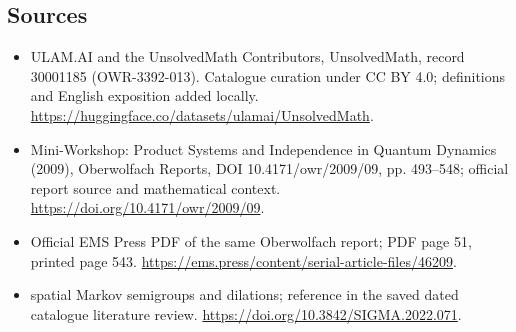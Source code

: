 \documentclass[11pt]{article}
\begin{document}
\subsection{Sources}
\begin{itemize}
\item[\hypertarget{source:30001185:1}{S1}] ULAM.AI and the UnsolvedMath Contributors, UnsolvedMath, record 30001185 (OWR-3392-013). Catalogue curation under CC BY 4.0; definitions and English exposition added locally.
\url{https://huggingface.co/datasets/ulamai/UnsolvedMath}.
\item[\hypertarget{source:30001185:2}{S2}] Mini-Workshop: Product Systems and Independence in Quantum Dynamics (2009), Oberwolfach Reports, DOI 10.4171/owr/2009/09, pp. 493--548; official report source and mathematical context.
\url{https://doi.org/10.4171/owr/2009/09}.
\item[\hypertarget{source:30001185:3}{S3}] Official EMS Press PDF of the same Oberwolfach report; PDF page 51, printed page 543.
\url{https://ems.press/content/serial-article-files/46209}.
\item[\hypertarget{source:30001185:4}{S4}] spatial Markov semigroups and dilations; reference in the saved dated catalogue literature review.
\url{https://doi.org/10.3842/SIGMA.2022.071}.
\end{itemize}
\label{end:30001185}
\end{document}
